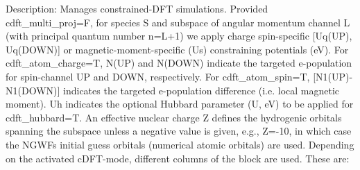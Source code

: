 \documentclass[letterpaper,10pt,english]{sphinxmanual}
\begin{document}
Description: Manages constrained-DFT simulations. Provided
cdft\_multi\_proj=F, for species S and subspace of angular momentum
channel L (with principal quantum number n=L+1) we apply charge
spin-specific {[}Uq(UP), Uq(DOWN){]} or magnetic-moment-specific (Us)
constraining potentials (eV). For cdft\_atom\_charge=T, N(UP) and
N(DOWN) indicate the targeted e-population for spin-channel UP and DOWN,
respectively. For cdft\_atom\_spin=T, {[}N1(UP)-N1(DOWN){]} indicates the
targeted e-population difference (i.e. local magnetic moment). Uh
indicates the optional Hubbard parameter (U, eV) to be applied for
cdft\_hubbard=T. An effective nuclear charge Z defines the hydrogenic
orbitals spanning the subspace unless a negative value is given, e.g.,
Z=-10, in which case the NGWFs initial guess orbitals (numerical atomic
orbitals) are used. Depending on the activated cDFT-mode, different
columns of the block are used. These are:
\end{document}
